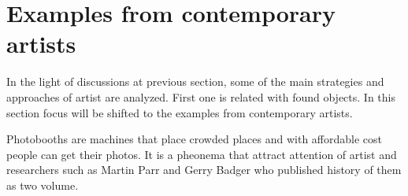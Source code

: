 






%
%
\section{Examples from contemporary artists}
In the light of discussions at previous section, some of the main strategies and approaches of artist are analyzed. First one is related with found objects. In this section focus will be shifted to the examples from contemporary artists.



Photobooths are machines that place crowded places and with affordable cost people can get their photos. It is a pheonema that attract attention of artist and researchers such as Martin Parr and Gerry Badger who published history of them as two volume.

